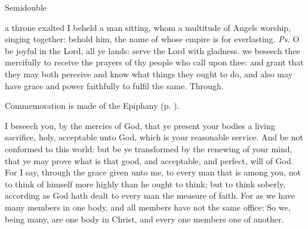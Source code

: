 \begin{inhead}
{Semidouble}
\end{inhead}
\par\noindent
{}


\properantiphonfix

\introit
{} a throne exalted I beheld a man sitting, whom a multitude of Angels worship, singing together: behold him, the name of whose empire is for everlasting. \textit{Ps.} O be joyful in the Lord, all ye lands: serve the Lord with gladness.
\collect
 we beseech thee mercifully to receive the prayers of thy people who call upon thee: and grant that they may both perceive and know what things they ought to do, and also may have grace and power faithfully to fulfil the same. Through.
\begin{rubric}
    Commemoration is made of the Epiphany (p. \pageref{EpiphanyMassCollect}).
\end{rubric}
 I beseech you, by the mercies of God, that ye present your bodies a living sacrifice, holy, acceptable unto God, which is your reasonable service. And be not conformed to this world: but be ye transformed by the renewing of your mind, that ye may prove what is that good, and acceptable, and perfect, will of God. For I say, through the grace given unto me, to every man that is among you, not to think of himself more highly than he ought to think; but to think soberly, according as God hath dealt to every man the measure of faith. For as we have many members in one body, and all members have not the same office: So we, being many, are one body in Christ, and every one members one of another.


